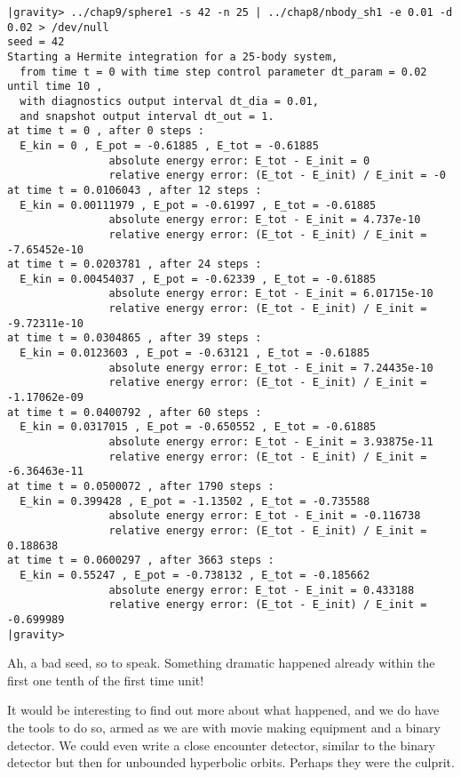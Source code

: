 \begin{small}
\begin{verbatim}
|gravity> ../chap9/sphere1 -s 42 -n 25 | ../chap8/nbody_sh1 -e 0.01 -d 0.02 > /dev/null
seed = 42
Starting a Hermite integration for a 25-body system,
  from time t = 0 with time step control parameter dt_param = 0.02  until time 10 ,
  with diagnostics output interval dt_dia = 0.01,
  and snapshot output interval dt_out = 1.
at time t = 0 , after 0 steps :
  E_kin = 0 , E_pot = -0.61885 , E_tot = -0.61885
                absolute energy error: E_tot - E_init = 0
                relative energy error: (E_tot - E_init) / E_init = -0
at time t = 0.0106043 , after 12 steps :
  E_kin = 0.00111979 , E_pot = -0.61997 , E_tot = -0.61885
                absolute energy error: E_tot - E_init = 4.737e-10
                relative energy error: (E_tot - E_init) / E_init = -7.65452e-10
at time t = 0.0203781 , after 24 steps :
  E_kin = 0.00454037 , E_pot = -0.62339 , E_tot = -0.61885
                absolute energy error: E_tot - E_init = 6.01715e-10
                relative energy error: (E_tot - E_init) / E_init = -9.72311e-10
at time t = 0.0304865 , after 39 steps :
  E_kin = 0.0123603 , E_pot = -0.63121 , E_tot = -0.61885
                absolute energy error: E_tot - E_init = 7.24435e-10
                relative energy error: (E_tot - E_init) / E_init = -1.17062e-09
at time t = 0.0400792 , after 60 steps :
  E_kin = 0.0317015 , E_pot = -0.650552 , E_tot = -0.61885
                absolute energy error: E_tot - E_init = 3.93875e-11
                relative energy error: (E_tot - E_init) / E_init = -6.36463e-11
at time t = 0.0500072 , after 1790 steps :
  E_kin = 0.399428 , E_pot = -1.13502 , E_tot = -0.735588
                absolute energy error: E_tot - E_init = -0.116738
                relative energy error: (E_tot - E_init) / E_init = 0.188638
at time t = 0.0600297 , after 3663 steps :
  E_kin = 0.55247 , E_pot = -0.738132 , E_tot = -0.185662
                absolute energy error: E_tot - E_init = 0.433188
                relative energy error: (E_tot - E_init) / E_init = -0.699989
|gravity> 
\end{verbatim}
\end{small}

\abc

\alice
Ah, a bad seed, so to speak.  Something dramatic happened already
within the first one tenth of the first time unit!

\carol
It would be interesting to find out more about what happened, and we
do have the tools to do so, armed as we are with movie making equipment
and a binary detector.  We could even write a close encounter detector,
similar to the binary detector but then for unbounded hyperbolic orbits.
Perhaps they were the culprit.

